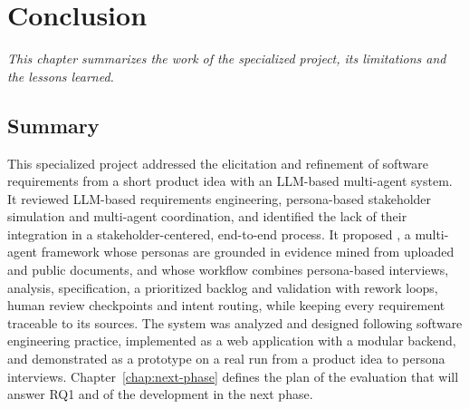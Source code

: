 \chapter{Conclusion}
\label{chap:conclusion}
\textit{This chapter summarizes the work of the specialized project, its limitations and the lessons learned.}

\section{Summary}
\label{sec:conc-summary}
This specialized project addressed the elicitation and refinement of software requirements from a short product idea with an LLM-based multi-agent system. It reviewed LLM-based requirements engineering, persona-based stakeholder simulation and multi-agent coordination, and identified the lack of their integration in a stakeholder-centered, end-to-end process. It proposed \sysname{}, a multi-agent framework whose personas are grounded in evidence mined from uploaded and public documents, and whose workflow combines persona-based interviews, analysis, specification, a prioritized backlog and validation with rework loops, human review checkpoints and intent routing, while keeping every requirement traceable to its sources. The system was analyzed and designed following software engineering practice, implemented as a web application with a modular backend, and demonstrated as a prototype on a real run from a product idea to persona interviews. Chapter~\ref{chap:next-phase} defines the plan of the evaluation that will answer RQ1 and of the development in the next phase.

